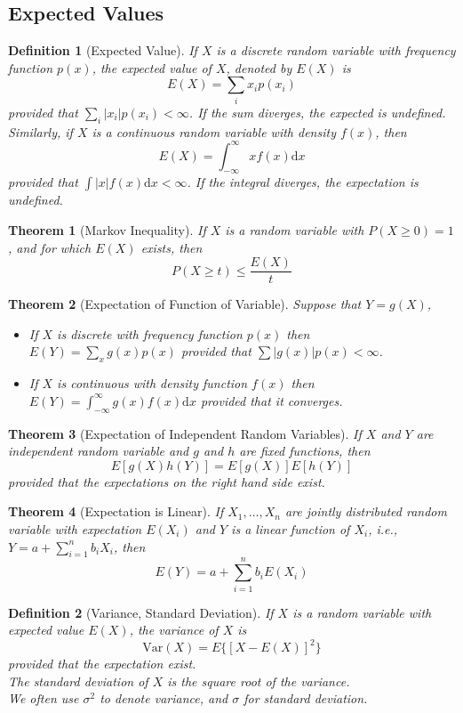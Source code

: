 \documentclass[12pt]{article}
\newcommand{\diff}{\mathrm{d}}
\newcommand{\var}{\mathrm{Var}}
\newtheorem{definition}{Definition}[section]
\newtheorem{theorem}{Theorem}[section]
\theoremstyle{definition}
\begin{document}
\subsection{Expected Values}
\begin{definition}[Expected Value]
\normalfont If $X$ is a discrete random variable with frequency function $p(x)$, the expected value of $X$, denoted by $E(X)$ is
\[
E(X) = \sum_i x_ip(x_i)
\]
provided that $\sum_i |x_i|p(x_i)<\infty$. If the sum diverges, the expected is undefined.\\
Similarly, if $X$ is a continuous random variable with density $f(x)$, then
\[
E(X) = \int_{-\infty}^\infty xf(x)\diff x
\]
provided that $\int |x|f(x)\diff x<\infty$. If the integral diverges, the expectation is undefined.
\end{definition}
\begin{theorem}[Markov Inequality]
\normalfont If $X$ is a random variable with $P(X\geq 0)=1$, and for which $E(X)$ exists, then 
\[
P(X\geq t) \leq \frac{E(X)}{t}
\]
\end{theorem}
\begin{theorem}[Expectation of Function of Variable]
\normalfont Suppose that $Y=g(X)$,
\begin{itemize}
  \item If $X$ is discrete with frequency function $p(x)$ then $E(Y) = \sum_{x}g(x)p(x)$ provided that $\sum|g(x)|p(x)<\infty$.
  \item If $X$ is continuous with density function $f(x)$ then $E(Y) = \int_{-\infty}^\infty g(x)f(x)\diff x$  provided that it converges.
\end{itemize}
\end{theorem}
\begin{theorem}[Expectation of Independent Random Variables]
\normalfont If $X$ and $Y$ are independent random variable and $g$ and $h$ are fixed functions, then 
\[
E[g(X)h(Y)] = E[g(X)]E[h(Y)]
\]
provided that the expectations on the right hand side exist.
\end{theorem}
\begin{theorem}[Expectation is Linear]
\normalfont If $X_1,\ldots,X_n$ are jointly distributed random variable with expectation $E(X_i)$ and $Y$ is a linear function of $X_i$, i.e., $Y=a+\sum_{i=1}^n b_iX_i$, then
\[
E(Y) = a+\sum_{i=1}^n b_iE(X_i)
\]
\end{theorem}
\begin{definition}[Variance, Standard Deviation]
\normalfont If $X$ is a random variable with expected value $E(X)$, the variance of $X$ is
\[
\var(X) = E\{[X-E(X)]^2\}
\]
provided that the expectation exist.\\
The standard deviation of $X$ is the square root of the variance.\\
We often use $\sigma^2$ to denote variance, and $\sigma$ for standard deviation.
\end{definition}
\end{document}

